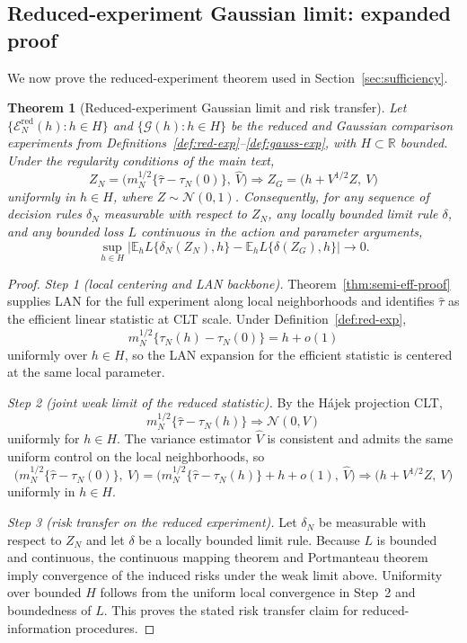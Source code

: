 \documentclass[aos]{imsart}
\newtheorem{theorem}{Theorem}
\theoremstyle{definition}
\theoremstyle{plain}
\newcommand{\E}{\mathbb{E}}
\newcommand{\R}{\mathbb{R}}
\begin{document}
\subsection{Reduced-experiment Gaussian limit: expanded proof}\label{app:suff}

We now prove the reduced-experiment theorem used in Section~\ref{sec:sufficiency}.

\begin{theorem}[Reduced-experiment Gaussian limit and risk transfer]\label{thm:asymp-suff-proof}
Let $\{\mathcal E_N^\mathrm{red}(h):h\in H\}$ and $\{\mathcal G(h):h\in H\}$ be the reduced and Gaussian comparison experiments from Definitions~\ref{def:red-exp}--\ref{def:gauss-exp}, with $H\subset\R$ bounded. Under the regularity conditions of the main text,
\[
Z_N=\Big(m_N^{1/2}\{\hat\tau-\tau_N(0)\},\ \hat V\Big)
\Rightarrow
Z_G=\bigl(h+V^{1/2}Z,\ V\bigr)
\]
uniformly in $h\in H$, where $Z\sim\mathcal N(0,1)$. Consequently, for any sequence of decision rules $\delta_N$ measurable with respect to $Z_N$, any locally bounded limit rule $\delta$, and any bounded loss $L$ continuous in the action and parameter arguments,
\[
\sup_{h\in H}\left|
\E_h L\{\delta_N(Z_N),h\}
-
\E_h L\{\delta(Z_G),h\}
\right|\to 0.
\]
\end{theorem}

\begin{proof}
\emph{Step 1 (local centering and LAN backbone).}
Theorem~\ref{thm:semi-eff-proof} supplies LAN for the full experiment along local neighborhoods and identifies $\hat\tau$ as the efficient linear statistic at CLT scale. Under Definition~\ref{def:red-exp},
\[
m_N^{1/2}\{\tau_N(h)-\tau_N(0)\}=h+o(1)
\]
uniformly over $h\in H$, so the LAN expansion for the efficient statistic is centered at the same local parameter.

\emph{Step 2 (joint weak limit of the reduced statistic).}
By the Hájek projection CLT,
\[
m_N^{1/2}\{\hat\tau-\tau_N(h)\}\Rightarrow \mathcal N(0,V)
\]
uniformly for $h\in H$. The variance estimator $\hat V$ is consistent and admits the same uniform control on the local neighborhoods, so
\[
\Big(m_N^{1/2}\{\hat\tau-\tau_N(0)\},\ \hat V\Big)
=
\Big(m_N^{1/2}\{\hat\tau-\tau_N(h)\}+h+o(1),\ \hat V\Big)
\Rightarrow
\bigl(h+V^{1/2}Z,\ V\bigr)
\]
uniformly in $h\in H$.

\emph{Step 3 (risk transfer on the reduced experiment).}
Let $\delta_N$ be measurable with respect to $Z_N$ and let $\delta$ be a locally bounded limit rule. Because $L$ is bounded and continuous, the continuous mapping theorem and Portmanteau theorem imply convergence of the induced risks under the weak limit above. Uniformity over bounded $H$ follows from the uniform local convergence in Step~2 and boundedness of $L$. This proves the stated risk transfer claim for reduced-information procedures.
\end{proof}
\end{document}
